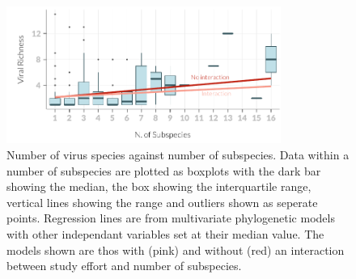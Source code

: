 






\begin{knitrout}\footnotesize
{}\color{fgcolor}\begin{figure}[t]

{\centering \includegraphics[width=0.8\textwidth]{figure/boxplot-1} 

}

\caption[Number of virus species against number of subspecies]{Number of virus species against number of subspecies. 
Data within a number of subspecies are plotted as boxplots with the dark bar showing the median, the box showing the interquartile range, vertical lines showing the range and outliers shown as seperate points.
Regression lines are from multivariate phylogenetic models with other independant variables set at their median value.
The models shown are thos with (pink) and without (red) an interaction between study effort and number of subspecies.
}\label{fig:boxplot}
\end{figure}


\end{knitrout}









